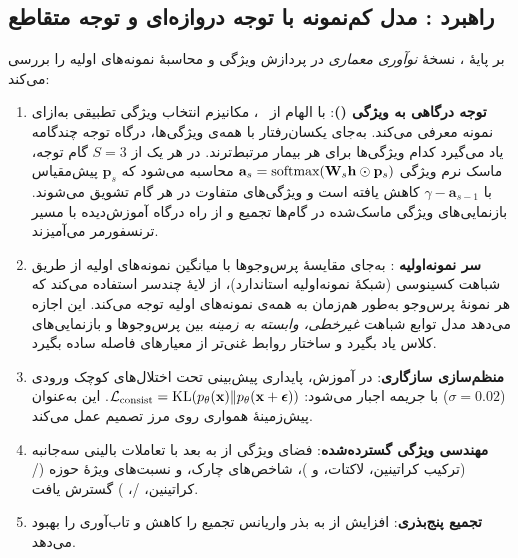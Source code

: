\subsection{راهبرد : مدل کم‌نمونه  با توجه دروازه‌ای و توجه متقاطع}
\label{sec:v5-strategy}

بر پایۀ ، نسخۀ  \emph{نوآوری معماری} در پردازش ویژگی و محاسبۀ نمونه‌های اولیه را بررسی می‌کند:

\begin{enumerate}
\item \textbf{توجه درگاهی به ویژگی ()}: با الهام از ~\cite{arik2021tabnet}،  مکانیزم انتخاب ویژگی تطبیقی به‌ازای نمونه معرفی می‌کند. به‌جای یکسان‌رفتار با همه‌ی ویژگی‌ها، درگاه توجه چندگامه یاد می‌گیرد کدام ویژگی‌ها برای هر بیمار مرتبط‌ترند. در هر یک از $S=3$ گام توجه، ماسک نرم ویژگی $\mathbf{a}_s = \text{softmax}(\mathbf{W}_s \mathbf{h} \odot \mathbf{p}_s)$ محاسبه می‌شود که $\mathbf{p}_s$ پیش‌مقیاس با $\gamma - \mathbf{a}_{s-1}$ کاهش یافته است و ویژگی‌های متفاوت در هر گام تشویق می‌شوند. بازنمایی‌های ویژگی ماسک‌شده در گام‌ها تجمیع و از راه درگاه آموزش‌دیده با مسیر ترنسفورمر می‌آمیزند.

\item \textbf{سر نمونه‌اولیه }: به‌جای مقایسۀ پرس‌وجوها با میانگین نمونه‌های اولیه از طریق شباهت کسینوسی (شبکۀ نمونه‌اولیه استاندارد)،  از لایۀ  چندسر استفاده می‌کند که هر نمونۀ پرس‌وجو به‌طور هم‌زمان به همه‌ی نمونه‌های اولیه توجه می‌کند. این اجازه می‌دهد مدل توابع شباهت \emph{غیرخطی، وابسته به زمینه} بین پرس‌وجوها و بازنمایی‌های کلاس یاد بگیرد و ساختار روابط غنی‌تر از معیارهای فاصله ساده بگیرد.

\item \textbf{منظم‌سازی سازگاری}: در آموزش، پایداری پیش‌بینی تحت اختلال‌های کوچک ورودی ($\sigma = 0.02$) با جریمه  اجبار می‌شود: $\mathcal{L}_{\text{consist}} = \text{KL}(p_\theta(\mathbf{x}) \| p_\theta(\mathbf{x} + \boldsymbol{\epsilon}))$. این به‌عنوان پیش‌زمینۀ همواری روی مرز تصمیم عمل می‌کند.

\item \textbf{مهندسی ویژگی گسترده‌شده}: فضای ویژگی از  به  بعد با تعاملات بالینی سه‌جانبه (ترکیب کراتینین، لاکتات، و )، شاخص‌های چارک، و نسبت‌های ویژۀ حوزه (/کراتینین، /، ) گسترش یافت.

\item \textbf{تجمیع پنج‌بذری}: افزایش از  به  بذر واریانس تجمیع را کاهش و تاب‌آوری را بهبود می‌دهد.
\end{enumerate}

